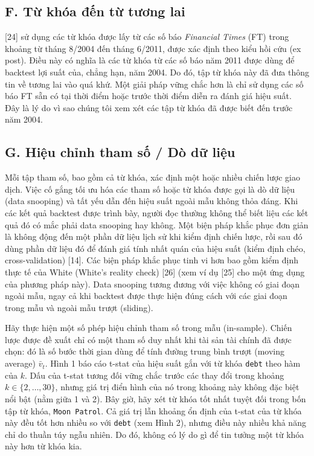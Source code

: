 \subsection*{F. Từ khóa đến từ tương lai}

[24] sử dụng các từ khóa được lấy từ các số báo \emph{Financial Times} (FT) trong khoảng từ tháng 8/2004 đến tháng 6/2011, được xác định theo kiểu hồi cứu (ex post). Điều này có nghĩa là các từ khóa từ các số báo năm 2011 được dùng để backtest lợi suất của, chẳng hạn, năm 2004. Do đó, tập từ khóa này đã đưa thông tin về tương lai vào quá khứ. Một giải pháp vững chắc hơn là chỉ sử dụng các số báo FT sẵn có tại thời điểm hoặc trước thời điểm diễn ra đánh giá hiệu suất. Đây là lý do vì sao chúng tôi xem xét các tập từ khóa đã được biết đến trước năm 2004.

\subsection*{G. Hiệu chỉnh tham số / Dò dữ liệu}

Mỗi tập tham số, bao gồm cả từ khóa, xác định một hoặc nhiều chiến lược giao dịch. Việc cố gắng tối ưu hóa các tham số hoặc từ khóa được gọi là dò dữ liệu (data snooping) và tất yếu dẫn đến hiệu suất ngoài mẫu không thỏa đáng. Khi các kết quả backtest được trình bày, người đọc thường không thể biết liệu các kết quả đó có mắc phải data snooping hay không. Một biện pháp khắc phục đơn giản là không động đến một phần dữ liệu lịch sử khi kiểm định chiến lược, rồi sau đó dùng phần dữ liệu đó để đánh giá tính nhất quán của hiệu suất (kiểm định chéo, cross-validation) [14]. Các biện pháp khắc phục tinh vi hơn bao gồm kiểm định thực tế của White (White's reality check) [26] (xem ví dụ [25] cho một ứng dụng của phương pháp này). Data snooping tương đương với việc không có giai đoạn ngoài mẫu, ngay cả khi backtest được thực hiện đúng cách với các giai đoạn trong mẫu và ngoài mẫu trượt (sliding).

Hãy thực hiện một số phép hiệu chỉnh tham số trong mẫu (in-sample). Chiến lược được đề xuất chỉ có một tham số duy nhất khi tài sản tài chính đã được chọn: đó là số bước thời gian dùng để tính đường trung bình trượt (moving average) $\bar v_t$. Hình 1 báo cáo t-stat của hiệu suất gắn với từ khóa \texttt{debt} theo hàm của $k$. Dấu của t-stat tương đối vững chắc trước các thay đổi trong khoảng $k \in \{2,\dots,30\}$, nhưng giá trị điển hình của nó trong khoảng này không đặc biệt nổi bật (nằm giữa 1 và 2). Bây giờ, hãy xét từ khóa tốt nhất tuyệt đối trong bốn tập từ khóa, \texttt{Moon Patrol}. Cả giá trị lẫn khoảng ổn định của t-stat của từ khóa này đều tốt hơn nhiều so với \texttt{debt} (xem Hình 2), nhưng điều này nhiều khả năng chỉ do thuần túy ngẫu nhiên. Do đó, không có lý do gì để tin tưởng một từ khóa này hơn từ khóa kia.

